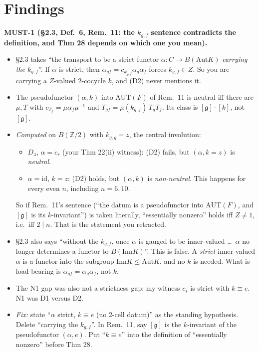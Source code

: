 \documentclass[10pt]{article}
\newcommand{\Z}{\mathbb{Z}}
\newcommand{\Inn}{\mathrm{Inn}}\newcommand{\Out}{\mathrm{Out}}\newcommand{\Aut}{\mathrm{Aut}}
\begin{document}
\section{Findings}
\textbf{MUST-1 (\S2.3, Def.~6, Rem.~11: the $k_{g,f}$ sentence contradicts the definition, and Thm 28 depends on which one you mean).}
\begin{itemize}
\item \S2.3 takes ``the transport to be a strict functor $\alpha:C\to B(\Aut K)$ \emph{carrying the $k_{g,f}$}''. If $\alpha$ is strict, then $\alpha_{gf}=c_{k_{g,f}}\alpha_g\alpha_f$ forces $k_{g,f}\in Z$. So you are carrying a $Z$-valued 2-cocycle $k$, and (D2) never mentions it.
\item The pseudofunctor $(\alpha,k)$ into $\mathrm{AUT}(F)$ of Rem.~11 is neutral iff there are $\mu,T$ with $c_{T_f}=\mu\alpha_f\mu^{-1}$ and $T_{gf}=\mu(k_{g,f})\,T_gT_f$. Its class is $[\mathfrak g]\cdot[k]$, not $[\mathfrak g]$.
\item \emph{Computed} on $B(\Z/2)$ with $k_{g,g}=z$, the central involution:
  \begin{itemize}
  \item $D_4$, $\alpha=c_r$ (your Thm 22(ii) witness): (D2) fails, but $(\alpha,k{=}z)$ is \emph{neutral}.
  \item $\alpha=\mathrm{id}$, $k=z$: (D2) holds, but $(\alpha,k)$ is \emph{non-neutral}. This happens for every even $n$, including $n=6,10$.
  \end{itemize}
  So if Rem.~11's sentence (``the datum is a pseudofunctor into $\mathrm{AUT}(F)$, and $[\mathfrak g]$ is its $k$-invariant'') is taken literally, ``essentially nonzero'' holds iff $Z\ne1$, i.e.\ iff $2\mid n$. That is the statement you retracted.
\item \S2.3 also says ``without the $k_{g,f}$, once $\alpha$ is gauged to be inner-valued \dots\ $\alpha$ no longer determines a functor to $B(\Inn K)$''. This is false. A \emph{strict} inner-valued $\alpha$ is a functor into the subgroup $\Inn K\le\Aut K$, and no $k$ is needed. What is load-bearing is $\alpha_{gf}=\alpha_g\alpha_f$, not $k$.
\item The N1 gap was also not a strictness gap: my witness $c_s$ is strict with $k\equiv e$. N1 was D1 versus D2.
\item \emph{Fix:} state ``$\alpha$ strict, $k\equiv e$ (no 2-cell datum)'' as the standing hypothesis. Delete ``carrying the $k_{g,f}$''. In Rem.~11, say $[\mathfrak g]$ is the $k$-invariant of the pseudofunctor $(\alpha,e)$. Put ``$k\equiv e$'' into the definition of ``essentially nonzero'' before Thm 28.
\end{itemize}
\end{document}
